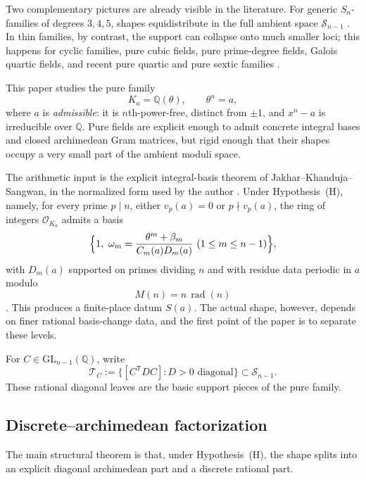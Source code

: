 \documentclass[11pt,letterpaper]{amsart}
\newcommand{\Q}{\mathbb{Q}}
\newcommand{\cO}{\mathcal{O}}
\newcommand{\GL}{\mathrm{GL}}
\theoremstyle{plain}
\theoremstyle{definition}
\begin{document}
Two complementary pictures are already visible in the literature.  For generic
\(S_n\)-families of degrees \(3,4,5\), shapes equidistribute in the full
ambient space \(\mathscr S_{n-1}\)
\cite{Terr1997,BhargavaHarron2016,Hough2019}.  In thin families, by contrast,
the support can collapse onto much smaller loci; this happens for cyclic
families, pure cubic fields, pure prime-degree fields, Galois quartic fields,
and recent pure quartic and pure sextic families
\cite{MantillaSolerMonsurro2016,BolanosMantillaSoler2021,BolanosMantillaSoler2023,Harron2017PureCubic,Holmes2025PurePrime,PiperHHarron2020,DasKalaMukhopadhyayRay2025,JakharKalwaniyaRayRoy2026}.

This paper studies the pure family
\[
K_a=\Q(\theta),\qquad \theta^n=a,
\]
where \(a\) is \emph{admissible}: it is \(n\)th-power-free, distinct from
\(\pm1\), and \(x^n-a\) is irreducible over \(\Q\).  Pure fields are explicit
enough to admit concrete integral bases and closed archimedean Gram matrices,
but rigid enough that their shapes occupy a very small part of the ambient
moduli space. 

The arithmetic input is the explicit integral-basis theorem of
Jakhar--Khanduja--Sangwan, in the normalized form used by the author \cite{NguyenDang2025MinPeriod}.  Under
Hypothesis~\textup{(H)}, namely, for every prime \(p\mid n\), either
\(v_p(a)=0\) or \(p\nmid v_p(a)\), the ring of integers \(\cO_{K_a}\) admits a
basis
\[
\Bigl\{1,\ \omega_m=\frac{\theta^m+\beta_m}{C_m(a)D_m(a)}
\ (1\le m\le n-1)\Bigr\},
\]
with \(D_m(a)\) supported on primes dividing \(n\) and with residue data
periodic in \(a\) modulo
\[
M(n)=n\,\operatorname{rad}(n)
\]
\cite{JakharKhandujaSangwan2021,NguyenDang2025MinPeriod}.  This produces a
finite-place datum \(S(a)\).  The actual shape, however, depends on finer
rational basis-change data, and the first point of the paper is to separate
these levels.

For \(C\in \GL_{n-1}(\Q)\), write
\[
\mathcal T_C
:=
\{[C^{\mathsf T}DC]: D>0\text{ diagonal}\}\subset \mathscr S_{n-1}.
\]
These rational diagonal leaves are the basic support pieces of the pure family.

\subsection{Discrete--archimedean factorization}

The main structural theorem is that, under Hypothesis~\textup{(H)}, the shape
splits into an explicit diagonal archimedean part and a discrete rational part.
\end{document}

